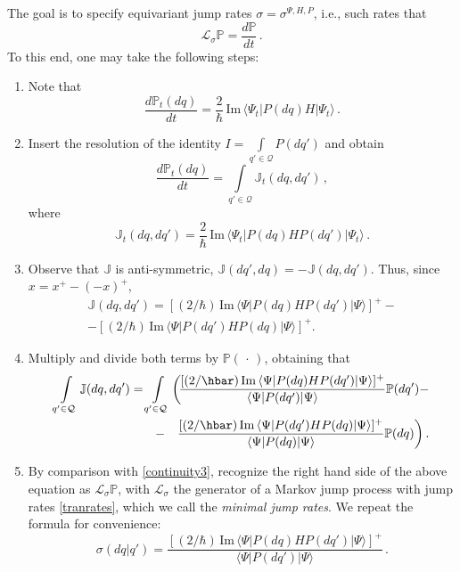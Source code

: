 \documentclass[12pt]{article}
\newcommand{\1}{\mathbf{1}} %
\renewcommand{\Im}{\mathrm{Im}} %
\renewcommand{\sp}[2]{\langle #1 | #2 \rangle} %
\newcommand{\conf}{\mathcal{Q}} %
\newcommand{\measure}{\mathbb{P}} %
\newcommand{\current}{\mathbb{J}}
\newcommand{\generator}{\mathscr{L}} %
\newcommand{\pov}{{P}}%
\begin{document}
The goal is to specify equivariant jump rates $\sigma = \sigma^{\Psi, H,
\pov}$, i.e., such rates that
\begin{equation}\label{equirates}
   \generator_\sigma \measure = \frac{d\measure}{dt} \,.
\end{equation}
To this end, one may take the following steps:

\begin{enumerate}
\item Note that
   \begin{equation}\label{dPdt}
     \frac{d\measure_t(dq)}{dt} = \frac{2}{\hbar} \, \Im \,
     \sp{\Psi_t}{\pov(dq) H| \Psi_t}\,.
   \end{equation}
\item Insert the resolution of the identity $I = 
\int\limits_{q'\in\conf}
   \pov(dq')$ and obtain
   \begin{equation}\label{dPdtJ}
     \frac{d\measure_t(dq)}{dt} =\int\limits_{q'\in\conf}
     \current_t(dq,dq') \,,
   \end{equation}
   where
   \begin{equation}\label{Jdef}
     \current_t(dq,dq') = \frac{2}{\hbar} \,
     \Im \, \sp{\Psi_t}{\pov(dq)H \pov(dq')| \Psi_t} \,.
   \end{equation}
\item Observe that $\current$ is anti-symmetric, $\current(dq',dq) = -
   \current(dq,dq')$.  Thus, since $x = x^+ - (-x)^+$,
   \[\begin{split}
     \current(dq,dq') = \left[(2/\hbar) \, \Im \, \sp{\Psi} {\pov(dq) H
     \pov(dq') |\Psi}\right]^+ - \\ - \left[(2/\hbar)\, \Im \, \sp{\Psi}
     {\pov(dq') H \pov(dq) |\Psi}\right]^+ .
   \end{split}\]
\item Multiply and divide both terms by $\measure(\,\cdot\,)$,
   obtaining that
   \begin{eqnarray*}
     \int\limits_{q'\in\conf} \current(dq,dq') = \int\limits_{q'\in\conf}
     \bigg( \hspace{-3ex} &&
     \frac{[(2/\hbar) \, \Im \, \sp{\Psi} {\pov(dq) H \pov(dq')| 
\Psi}]^+}
     {\sp{\Psi}{\pov(dq')| \Psi}} \measure(dq') -
   \\-&&
     \frac{[(2/\hbar) \, \Im \, \sp{\Psi} {\pov(dq') H \pov(dq)| \Psi}
     ]^+} {\sp{\Psi} {\pov(dq)| \Psi}} \measure(dq) \bigg) \,.
\end{eqnarray*}
\item By comparison with \eqref{continuity3}, recognize the right hand
   side of the above equation as $\generator_\sigma \measure$, with
   $\generator_\sigma$ the generator of a Markov jump process with jump
   rates \eqref{tranrates}, which we call the \emph{minimal jump
   rates}. We repeat the formula for convenience:
   \[
     \sigma(dq|q')= \frac{[(2/\hbar) \, \Im \, \sp{\Psi} {\pov(dq) H
     \pov(dq')| \Psi}]^+}{\sp{\Psi}{\pov(dq')| \Psi}}\,.
   \]
\end{enumerate}
\end{document}
